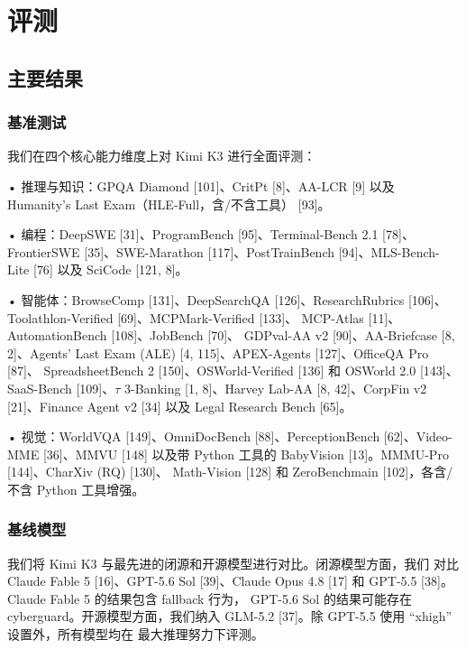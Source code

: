 \documentclass[
  10
]{article}
\begin{document}
\section{评测}\label{evaluations}

\subsection{主要结果}\label{main-results}

\subsubsection{基准测试}\label{benchmarks}

我们在四个核心能力维度上对 Kimi K3 进行全面评测：

• 推理与知识：GPQA Diamond {[}101{]}、CritPt {[}8{]}、AA-LCR
{[}9{]} 以及 Humanity's Last Exam（HLE-Full，含/不含工具）
{[}93{]}。

• 编程：DeepSWE {[}31{]}、ProgramBench {[}95{]}、Terminal-Bench 2.1
{[}78{]}、FrontierSWE {[}35{]}、SWE-Marathon {[}117{]}、PostTrainBench
{[}94{]}、MLS-Bench-Lite {[}76{]} 以及 SciCode {[}121, 8{]}。

• 智能体：BrowseComp {[}131{]}、DeepSearchQA {[}126{]}、ResearchRubrics
{[}106{]}、Toolathlon-Verified {[}69{]}、MCPMark-Verified {[}133{]}、
MCP-Atlas {[}11{]}、AutomationBench {[}108{]}、JobBench {[}70{]}、
GDPval-AA v2 {[}90{]}、AA-Briefcase {[}8, 2{]}、Agents' Last Exam (ALE)
{[}4, 115{]}、APEX-Agents {[}127{]}、OfficeQA Pro {[}87{]}、
SpreadsheetBench 2 {[}150{]}、OSWorld-Verified {[}136{]} 和 OSWorld 2.0
{[}143{]}、SaaS-Bench {[}109{]}、$\tau$ 3-Banking {[}1, 8{]}、Harvey Lab-AA
{[}8, 42{]}、CorpFin v2 {[}21{]}、Finance Agent v2 {[}34{]} 以及 Legal
Research Bench {[}65{]}。

• 视觉：WorldVQA {[}149{]}、OmniDocBench {[}88{]}、PerceptionBench
{[}62{]}、Video-MME {[}36{]}、MMVU {[}148{]} 以及带 Python 工具的 BabyVision
{[}13{]}。MMMU-Pro {[}144{]}、CharXiv (RQ) {[}130{]}、
Math-Vision {[}128{]} 和 ZeroBenchmain {[}102{]}，各含/不含
Python 工具增强。

\subsubsection{基线模型}\label{baselines}

我们将 Kimi K3 与最先进的闭源和开源模型进行对比。闭源模型方面，我们
对比 Claude Fable 5 {[}16{]}、GPT-5.6 Sol {[}39{]}、Claude Opus 4.8
{[}17{]} 和 GPT-5.5 {[}38{]}。Claude Fable 5 的结果包含 fallback 行为，
GPT-5.6 Sol 的结果可能存在 cyberguard。开源模型方面，我们纳入
GLM-5.2 {[}37{]}。除 GPT-5.5 使用 ``xhigh'' 设置外，所有模型均在
最大推理努力下评测。
\end{document}
